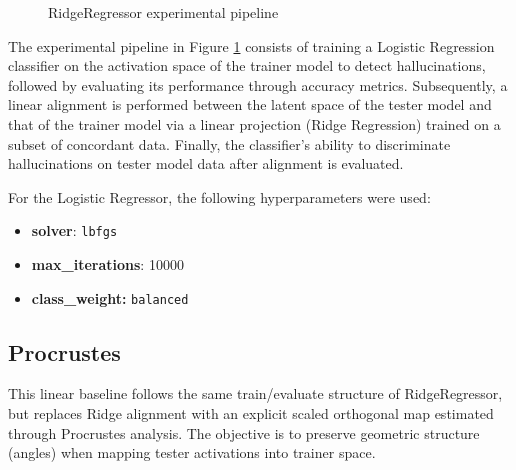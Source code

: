 \begin{figure}[t]
{%
}
    \caption{RidgeRegressor experimental pipeline}
    \label{fig:linear-pipeline}
\end{figure}
The experimental pipeline in Figure \ref{fig:linear-pipeline} consists of training a Logistic Regression classifier on the activation space of the trainer model to detect hallucinations, followed by evaluating its performance through accuracy metrics. Subsequently, a linear alignment is performed between the latent space of the tester model and that of the trainer model via a linear projection (Ridge Regression) trained on a subset of concordant data. Finally, the classifier's ability to discriminate hallucinations on tester model data after alignment is evaluated.

For the Logistic Regressor, the following hyperparameters were used:
\begin{itemize}
\item \textbf{solver}: \texttt{lbfgs}
\item \textbf{max\_iterations}: 10000
\item \textbf{class\_weight:} \texttt{balanced}
\end{itemize}

\subsection{Procrustes}
This linear baseline follows the same train/evaluate structure of RidgeRegressor, but replaces Ridge alignment with an explicit scaled orthogonal map estimated through Procrustes analysis. The objective is to preserve geometric structure (angles) when mapping tester activations into trainer space.

